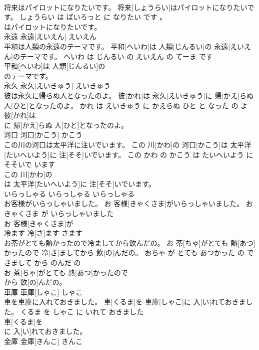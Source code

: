 \documentclass[8pt]{extreport}
\begin{document}
\begin{CJK}{UTF8}{min}
\\	将来はパイロットになりたいです。	将来[しょうらい]はパイロットになりたいです。	しょうらい は ぱいろっと に なりたい です 。	
\\	はパイロットになりたいです。			
\\	永遠	永遠[えいえん]	えいえん	
\\	平和は人類の永遠のテーマです。	平和[へいわ]は 人類[じんるい]の 永遠[えいえん]のテーマです。	へいわ は じんるい の えいえん の てーま です	
\\	平和[へいわ]は 人類[じんるい]の
\\	のテーマです。			
\\	永久	永久[えいきゅう]	えいきゅう	
\\	彼は永久に帰らぬ人となったのよ。	彼[かれ]は 永久[えいきゅう]に 帰[かえ]らぬ 人[ひと]となったのよ。	かれ は えいきゅう に かえらぬ ひと と なった の よ	
\\	彼[かれ]は
\\	に 帰[かえ]らぬ 人[ひと]となったのよ。			
\\	河口	河口[かこう]	かこう	
\\	この川の河口は太平洋に注いでいます。	この 川[かわ]の 河口[かこう]は 太平洋[たいへいよう]に 注[そそ]いでいます。	この かわ の かこう は たいへいよう に そそいで います	
\\	この 川[かわ]の
\\	は 太平洋[たいへいよう]に 注[そそ]いでいます。			
\\	いらっしゃる	いらっしゃる	いらっしゃる	
\\	お客様がいらっしゃいました。	お 客様[きゃくさま]がいらっしゃいました。	おきゃくさま が いらっしゃいました	
\\	お 客様[きゃくさま]が
\\	冷ます	冷[さ]ます	さます	
\\	お茶がとても熱かったので冷ましてから飲んだの。	お 茶[ちゃ]がとても 熱[あつ]かったので 冷[さ]ましてから 飲[の]んだの。	おちゃ が とても あつかった の で さまして から のんだ の	
\\	お 茶[ちゃ]がとても 熱[あつ]かったので
\\	から 飲[の]んだの。			
\\	車庫	車庫[しゃこ]	しゃこ	
\\	車を車庫に入れておきました。	車[くるま]を 車庫[しゃこ]に 入[い]れておきました。	くるま を しゃこ に いれて おきました	
\\	車[くるま]を
\\	に 入[い]れておきました。			
\\	金庫	金庫[きんこ]	きんこ	

\end{CJK}
\end{document}
